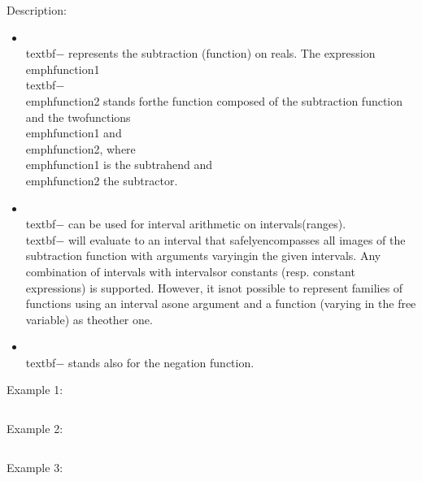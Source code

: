 \noindent Description: \begin{itemize}

\item \\textbf{$-$} represents the subtraction (function) on reals. \n   The expression \\emph{function1} \\textbf{$-$} \\emph{function2} stands for\n   the function composed of the subtraction function and the two\n   functions \\emph{function1} and \\emph{function2}, where \\emph{function1} is \n   the subtrahend and \\emph{function2} the subtractor.\n
\item \\textbf{$-$} can be used for interval arithmetic on intervals\n   (ranges). \\textbf{$-$} will evaluate to an interval that safely\n   encompasses all images of the subtraction function with arguments varying\n   in the given intervals.  Any combination of intervals with intervals\n   or constants (resp. constant expressions) is supported. However, it is\n   not possible to represent families of functions using an interval as\n   one argument and a function (varying in the free variable) as the\n   other one.\n
\item \\textbf{$-$} stands also for the negation function.\n\end{itemize}
\noindent Example 1: 
\begin{center}\begin{minipage}{15cm}\begin{Verbatim}[frame=single]
\end{Verbatim}
\end{minipage}\end{center}
\noindent Example 2: 
\begin{center}\begin{minipage}{15cm}\begin{Verbatim}[frame=single]
\end{Verbatim}
\end{minipage}\end{center}
\noindent Example 3: 
\begin{center}\begin{minipage}{15cm}\begin{Verbatim}[frame=single]
\end{Verbatim}
\end{minipage}\end{center}
